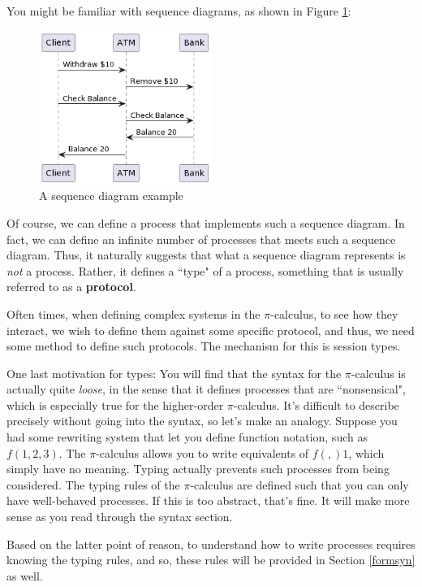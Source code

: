 You might be familiar with sequence diagrams, as shown in Figure \ref{seqdiaexp}:
\begin{figure}
\centering
\includegraphics[width=0.5\textwidth]{figures/exampleseq.png}
\caption{\label{seqdiaexp} A sequence diagram example}
\end{figure}

Of course, we can define a process that implements such a sequence diagram. In fact, we can define an infinite number of processes that meets such a sequence diagram. Thus, it naturally suggests that what a sequence diagram represents is \textit{not} a process. Rather, it defines a ``type" of a process, something that is usually referred to as a \textbf{protocol}.

Often times, when defining complex systems in the $\pi$-calculus, to see how they interact, we wish to define them against some specific protocol, and thus, we need some method to define such protocols. The mechanism for this is session types.

One last motivation for types: You will find that the syntax for the $\pi$-calculus is actually quite \textit{loose}, in the sense that it defines processes that are ``nonsensical", which is especially true for the higher-order $\pi$-calculus. It's difficult to describe precisely without going into the syntax, so let's make an analogy. Suppose you had some rewriting system that let you define function notation, such as $f(1,2,3)$. The $\pi$-calculus allows you to write equivalents of $f(,)1$, which simply have no meaning. Typing actually prevents such processes from being considered. The typing rules of the $\pi$-calculus are defined such that you can only have well-behaved processes. If this is too abstract, that's fine. It will make more sense as you read through the syntax section.

Based on the latter point of reason, to understand how to write processes requires knowing the typing rules, and so, these rules will be provided in Section \ref{formsyn} as well.

